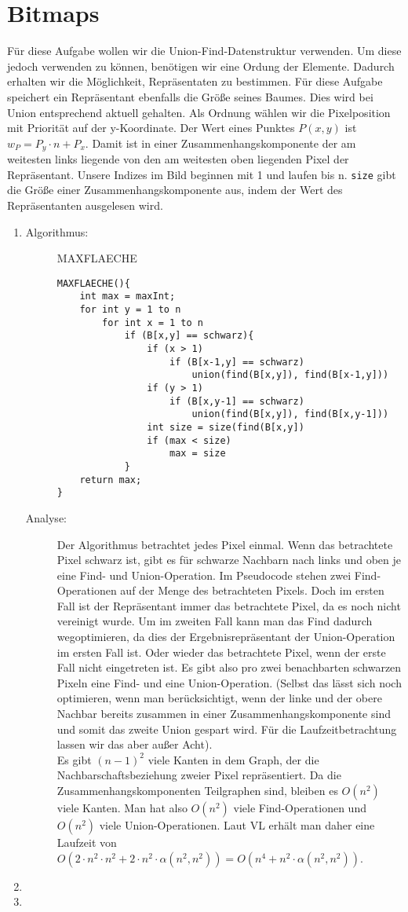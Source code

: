 \documentclass[a4paper,10pt]{article}
\begin{document}
\section{Bitmaps}
Für diese Aufgabe wollen wir die Union-Find-Datenstruktur verwenden. Um diese jedoch verwenden zu können, benötigen wir eine Ordung der Elemente. Dadurch erhalten wir die Möglichkeit, Repräsentaten zu bestimmen. Für diese Aufgabe speichert ein Repräsentant ebenfalls die Größe seines Baumes. Dies wird bei Union entsprechend aktuell gehalten. Als Ordnung wählen wir die Pixelposition mit Priorität auf der y-Koordinate.
Der Wert eines Punktes $P(x,y)$ ist $w_P=P_y \cdot n + P_x$. Damit ist in einer Zusammenhangskomponente der am weitesten links liegende von den am weitesten oben liegenden Pixel der Repräsentant. Unsere Indizes im Bild beginnen mit 1 und laufen bis n. \texttt{size} gibt die Größe einer Zusammenhangskomponente aus, indem der Wert des Repräsentanten ausgelesen wird.
\begin{enumerate}
\item \begin{description}
	\item[Algorithmus:] MAXFLAECHE \begin{lstlisting}
MAXFLAECHE(){
	int max = maxInt;
	for int y = 1 to n
		for int x = 1 to n
			if (B[x,y] == schwarz){
				if (x > 1)
					if (B[x-1,y] == schwarz)
						union(find(B[x,y]), find(B[x-1,y]))
				if (y > 1)
					if (B[x,y-1] == schwarz)
						union(find(B[x,y]), find(B[x,y-1]))
				int size = size(find(B[x,y])
				if (max < size)
					max = size
			}
	return max;
}
	\end{lstlisting}
\item[Analyse:] Der Algorithmus betrachtet jedes Pixel einmal. Wenn das betrachtete Pixel schwarz ist, gibt es für schwarze Nachbarn nach links und oben je eine Find- und Union-Operation. Im Pseudocode stehen zwei Find-Operationen auf der Menge des betrachteten Pixels. Doch im ersten Fall ist der Repräsentant immer das betrachtete Pixel, da es noch nicht vereinigt wurde. Um im zweiten Fall kann man das Find dadurch wegoptimieren, da dies der Ergebnisrepräsentant der Union-Operation im ersten Fall ist. Oder wieder das betrachtete Pixel, wenn der erste Fall nicht eingetreten ist. Es gibt also pro zwei benachbarten schwarzen Pixeln eine Find- und eine Union-Operation. (Selbst das lässt sich noch optimieren, wenn man berücksichtigt, wenn der linke und der obere Nachbar bereits zusammen in einer Zusammenhangskomponente sind und somit das zweite Union gespart wird. Für die Laufzeitbetrachtung lassen wir das aber außer Acht).\\
Es gibt $(n-1)^2$ viele Kanten in dem Graph, der die Nachbarschaftsbeziehung zweier Pixel repräsentiert. Da die Zusammenhangskomponenten Teilgraphen sind, bleiben es $O(n^2)$ viele Kanten. Man hat also $O(n^2)$ viele Find-Operationen und $O(n^2)$ viele Union-Operationen. Laut VL erhält man daher eine Laufzeit von $O(2 \cdot n^2 \cdot n^2 + 2 \cdot n^2 \cdot \alpha (n^2,n^2)) = O(n^4 + n^2 \cdot \alpha (n^2,n^2))$.
\end{description}
\item
\item
\end{enumerate}
\end{document}
